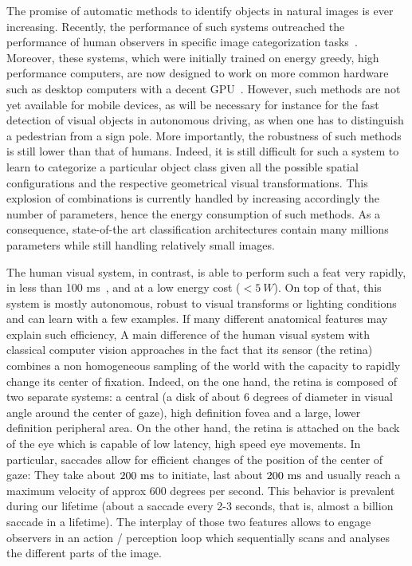 The promise of automatic methods to identify objects in natural images is ever increasing. Recently, the performance of such systems outreached the performance of human observers in specific image categorization tasks\CNS~\citep{He15}\fi. \CNS Moreover, these systems, which were initially trained on energy greedy, high performance computers, are now designed to work on more common hardware such as desktop computers with a decent GPU~\citep{Sandler18}.
However, such methods are not yet available for mobile devices, as will be necessary for instance for the fast detection of visual objects in autonomous driving, as when one has to distinguish a pedestrian from a sign pole. More importantly, the robustness of such methods is still lower than that of humans. Indeed, it is still difficult for such a system to learn to categorize a particular object class given all the possible spatial configurations and the respective geometrical visual transformations. This explosion of combinations is currently handled by increasing accordingly the number of parameters, hence the energy consumption of such methods. As a consequence, state-of-the art classification architectures contain many millions parameters while still handling relatively small images.

The human visual system, in contrast, is able to perform such a feat very rapidly, in less than 100 ms~\citep{Kirchner06}, and at a low energy cost ($<5~W$). On top of that, this system is mostly autonomous, robust to visual transforms or lighting conditions and can learn with a few examples. If many different anatomical features may explain such efficiency, \fi A main difference of the human visual system with classical computer vision approaches in the fact that its sensor (the retina) combines a non homogeneous sampling of the world with the capacity to rapidly change its center of fixation. Indeed, on the one hand, the retina is composed of two separate systems: a central (a disk of about 6 degrees of diameter in visual angle around the center of gaze), high definition fovea and a large, lower definition peripheral area. On the other hand, the retina is attached on the back of the eye which is capable of low latency, high speed eye movements. \CNS In particular, saccades allow for efficient changes of the position of the center of gaze: They take about $200~\si{\milli\second}$ to initiate, last about $200~\si{\milli\second}$ and usually reach a maximum velocity of approx 600 degrees per second. This behavior is prevalent during our lifetime (about a saccade every 2-3 seconds, that is, almost a billion saccade in a lifetime). \fi The interplay of those two features allows to engage observers in an action / perception loop which sequentially scans and analyses the different parts of the image. 

